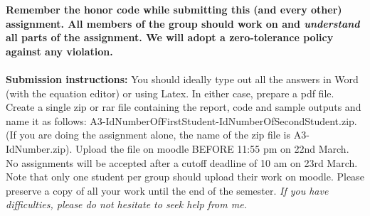 \documentclass[11pt]{article}
\begin{document}
\maketitle

\textbf{Remember the honor code while submitting this (and every other) assignment. All members of the group should work on and \emph{understand} all parts of the assignment. We will adopt a \textbf{zero-tolerance policy} against any violation.}
\\
\\
\textbf{Submission instructions:} You should ideally type out all the answers in Word (with the equation editor) or using Latex. In either case, prepare a pdf file. Create a single zip or rar file containing the report, code and sample outputs and name it as follows: A3-IdNumberOfFirstStudent-IdNumberOfSecondStudent.zip. (If you are doing the assignment alone, the name of the zip file is A3-IdNumber.zip). Upload the file on moodle BEFORE 11:55 pm on 22nd March. No assignments will be accepted after a cutoff deadline of 10 am on 23rd March. Note that only one student per group should upload their work on moodle. Please preserve a copy of all your work until the end of the semester. \emph{If you have difficulties, please do not hesitate to seek help from me.} 
\end{document}
